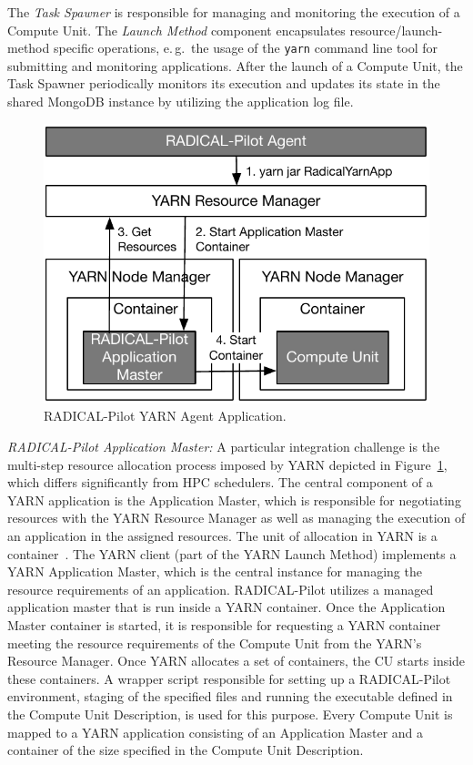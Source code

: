 The \emph{Task Spawner} is responsible for managing and monitoring the execution of a Compute Unit.
The \emph{Launch Method} component encapsulates resource/launch-method specific operations, e.\,g.\ the usage of the \texttt{yarn} command line tool for submitting and monitoring applications.
After the launch of a Compute Unit, the Task Spawner periodically monitors its execution and updates its state in the shared MongoDB instance by utilizing the application log file.

\begin{figure}[t]
    \centering
    \includegraphics[width=.65\textwidth]{figures/data_analytics_hpc/hpc_hadoop/yarn.pdf}
    \caption{RADICAL-Pilot YARN Agent Application.}
    \label{fig:figures_yarn}
\end{figure}

\emph{RADICAL-Pilot Application Master:}
A particular integration challenge is the multi-step resource allocation process imposed by YARN depicted in Figure~\ref{fig:figures_yarn}, which differs significantly from HPC schedulers.
The central component of a YARN application is the Application Master, which is responsible for negotiating resources with the YARN Resource Manager as well as managing the execution of an application in the assigned resources.
The unit of allocation in YARN is a container~\cite{murthy2014apache}.
The YARN client (part of the YARN Launch Method) implements a YARN Application Master, which is the central instance for managing the resource requirements of an application.
RADICAL-Pilot utilizes a managed application master that is run inside a YARN container.
Once the Application Master container is started, it is responsible for requesting a YARN container meeting the resource requirements of the Compute Unit from the YARN's Resource Manager.
Once YARN allocates a set of containers, the CU starts inside these containers.
A wrapper script responsible for setting up a RADICAL-Pilot environment, staging of the specified files and running the executable defined in the Compute Unit Description, is used for this purpose.
Every Compute Unit is mapped to a YARN application consisting of an Application Master and a container of the size specified in the Compute Unit Description.

